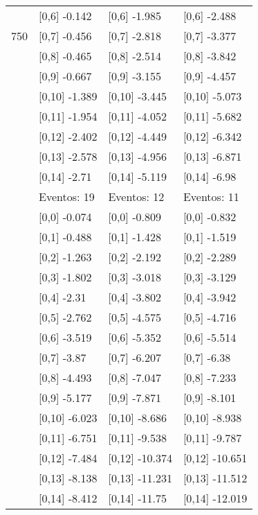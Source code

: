 \begin{table}
\begin{tabular}[t]{llll}
 & {}[0,6] -0.142 & {}[0,6] -1.985 & {}[0,6] -2.488\\
750 & {}[0,7] -0.456 & {}[0,7] -2.818 & {}[0,7] -3.377\\
\addlinespace
 & {}[0,8] -0.465 & {}[0,8] -2.514 & {}[0,8] -3.842\\
 & {}[0,9] -0.667 & {}[0,9] -3.155 & {}[0,9] -4.457\\
 & {}[0,10] -1.389 & {}[0,10] -3.445 & {}[0,10] -5.073\\
 & {}[0,11] -1.954 & {}[0,11] -4.052 & {}[0,11] -5.682\\
 & {}[0,12] -2.402 & {}[0,12] -4.449 & {}[0,12] -6.342\\
\addlinespace
 & {}[0,13] -2.578 & {}[0,13] -4.956 & {}[0,13] -6.871\\
 & {}[0,14] -2.71 & {}[0,14] -5.119 & {}[0,14] -6.98\\
 & Eventos:  19 & Eventos:  12 & Eventos:  11\\
 & {}[0,0] -0.074 & {}[0,0] -0.809 & {}[0,0] -0.832\\
 & {}[0,1] -0.488 & {}[0,1] -1.428 & {}[0,1] -1.519\\
\addlinespace
 & {}[0,2] -1.263 & {}[0,2] -2.192 & {}[0,2] -2.289\\
 & {}[0,3] -1.802 & {}[0,3] -3.018 & {}[0,3] -3.129\\
 & {}[0,4] -2.31 & {}[0,4] -3.802 & {}[0,4] -3.942\\
 & {}[0,5] -2.762 & {}[0,5] -4.575 & {}[0,5] -4.716\\
 & {}[0,6] -3.519 & {}[0,6] -5.352 & {}[0,6] -5.514\\
\addlinespace
1000 & {}[0,7] -3.87 & {}[0,7] -6.207 & {}[0,7] -6.38\\
 & {}[0,8] -4.493 & {}[0,8] -7.047 & {}[0,8] -7.233\\
 & {}[0,9] -5.177 & {}[0,9] -7.871 & {}[0,9] -8.101\\
 & {}[0,10] -6.023 & {}[0,10] -8.686 & {}[0,10] -8.938\\
 & {}[0,11] -6.751 & {}[0,11] -9.538 & {}[0,11] -9.787\\
\addlinespace
 & {}[0,12] -7.484 & {}[0,12] -10.374 & {}[0,12] -10.651\\
 & {}[0,13] -8.138 & {}[0,13] -11.231 & {}[0,13] -11.512\\
 & {}[0,14] -8.412 & {}[0,14] -11.75 & {}[0,14] -12.019\\
\bottomrule
\end{tabular}
\end{table}
